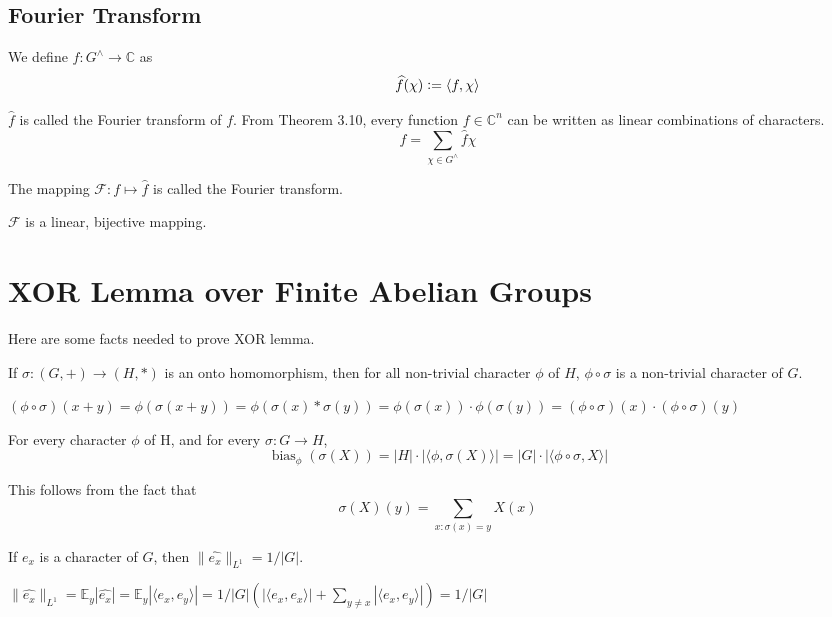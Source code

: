 \section{Fourier Transform}
\begin{definition}
We define $\widehat{f} : G^\land \rightarrow \mathbb{C}$ as
$$\widehat{f}(\chi) \vcentcolon= \langle f, \chi \rangle $$
\end{definition}
$\widehat{f}$ is called the Fourier transform of $f$.
From Theorem 3.10, every function $f \in \mathbb{C}^n$ can be written as linear combinations of characters. 
$$f = \sum\limits_{\chi \in G^\land} \widehat{f} \chi$$

\begin{definition}
The mapping $\mathcal{F} : f \mapsto \widehat{f}$ is called the Fourier transform. 
\end{definition}

\begin{prop}
$\mathcal{F}$ is a linear, bijective mapping. 
\end{prop}

\chapter{XOR Lemma over Finite Abelian Groups}

Here are some facts needed to prove XOR lemma. 
\begin{fact}
If $\sigma : (G, +) \rightarrow (H, *)$ is an onto homomorphism, then for all non-trivial character $\phi$ of $H$, $\phi \circ \sigma$ is a non-trivial character of $G$.
\end{fact} 
$(\phi \circ \sigma)(x+y) = \phi (\sigma (x+y)) = \phi (\sigma(x) * \sigma(y))
= \phi (\sigma (x)) \cdot \phi (\sigma (y)) 
= (\phi \circ \sigma)(x) \cdot (\phi \circ \sigma)(y)$

\begin{fact}
For every character $\phi$ of H, and for every $\sigma: G \rightarrow H$,
$$\operatorname{bias}_\phi(\sigma (X))
= |H| \cdot |\langle \phi, \sigma(X) \rangle | 
= |G| \cdot |\langle \phi \circ \sigma, X \rangle |$$
\end{fact}
This follows from the fact that
$$\sigma(X)(y) = \sum\limits_{x : \sigma(x) = y} X(x)$$

\begin{fact}
If $e_x$ is a character of $G$, then $\| \widehat{e_x} \|_{L^1} = 1 / |G|$.
\end{fact}
$\| \widehat{e_x} \|_{L^1} = \mathbb{E}_y |\widehat{e_x}| 
= \mathbb{E}_y |\langle e_x , e_y \rangle| = 1/|G| (|\langle e_x, e_x \rangle| 
+ \sum\limits_{y \neq x} |\langle e_x, e_y \rangle|) = 1/|G|$

